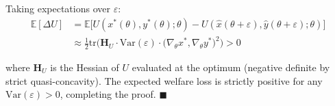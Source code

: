 \documentclass[AER]{AEA}
\newcommand{\qed}{\nolinebreak\hfill\ensuremath{\blacksquare}\par}
\begin{document}
Taking expectations over $\varepsilon$:
\begin{align}
\mathbb{E}[\Delta U] &= \mathbb{E}\big[U(x^*(\theta), y^*(\theta); \theta) - U(\hat{x}(\theta + \varepsilon), \hat{y}(\theta + \varepsilon); \theta)\big] \\
&\approx \frac{1}{2} \text{tr}\Big(\mathbf{H}_U \cdot \text{Var}(\varepsilon) \cdot \big(\nabla_\theta x^*, \nabla_\theta y^*\big)^2\Big) > 0
\end{align}

where $\mathbf{H}_U$ is the Hessian of $U$ evaluated at the optimum (negative definite by strict quasi-concavity). The expected welfare loss is strictly positive for any $\text{Var}(\varepsilon) > 0$, completing the proof. \qed
\end{document}
